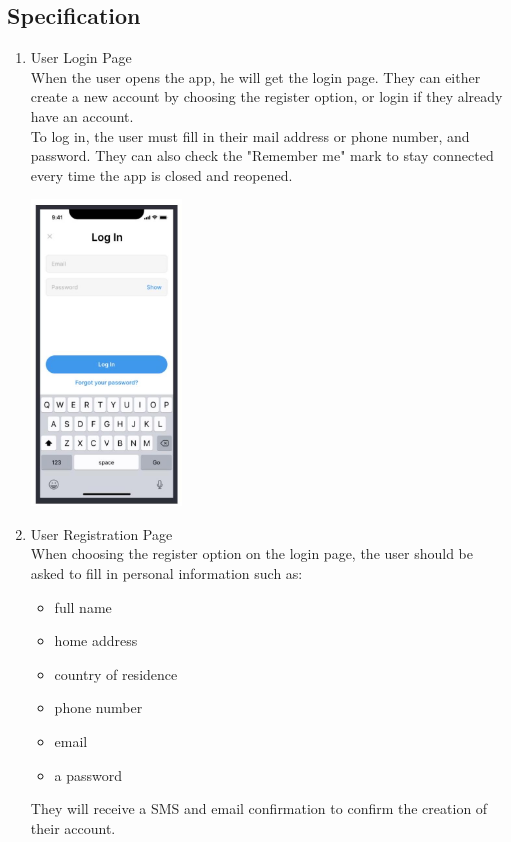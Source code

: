 \documentclass[10pt]{article}
\begin{document}
\begin{multicols}{2}
\section{Specification}

\begin{enumerate}
  \item {User Login Page} \\
  When the user opens the app, he will get the login page. They can either create a new account by choosing the register option, or login if they already have an account. \\
  To log in, the user must fill in their mail address or phone number, and password. They can also check the "Remember me" mark to stay connected every time the app is closed and reopened. \\
  \begin{center}
    \includegraphics[max width=4cm]{login.jpg}
  \end{center}
  
  \item {User Registration Page} \\
  When choosing the register option on the login page, the user should be asked to fill in personal information such as:
  \begin{itemize}
    \item full name
    \item home address
    \item country of residence
    \item phone number
    \item email
    \item a password
  \end{itemize}
  They will receive a SMS and email confirmation to confirm the creation of their account.
  

\end{enumerate}
\end{multicols}
\end{document}
